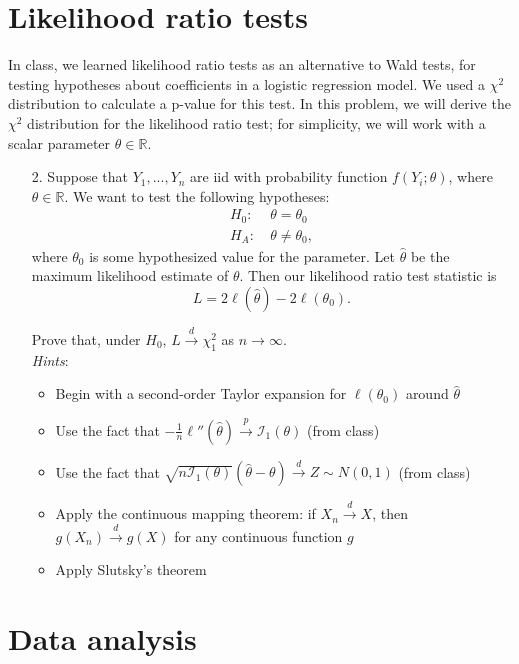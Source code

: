 \documentclass[11pt]{article}
\begin{document}
\section*{Likelihood ratio tests}

In class, we learned likelihood ratio tests as an alternative to Wald tests, for testing hypotheses about coefficients in a logistic regression model. We used a $\chi^2$ distribution to calculate a p-value for this test. In this problem, we will derive the $\chi^2$ distribution for the likelihood ratio test; for simplicity, we will work with a scalar parameter $\theta \in \mathbb{R}$.

\begin{enumerate}
\item[2.] Suppose that $Y_1,...,Y_n$ are iid with probability function $f(Y_i; \theta)$, where $\theta \in \mathbb{R}$. We want to test the following hypotheses:
\begin{align*}
H_0: \ &\theta = \theta_0 \\
H_A: \ &\theta \neq \theta_0,
\end{align*}
where $\theta_0$ is some hypothesized value for the parameter. Let $\widehat{\theta}$ be the maximum likelihood estimate of $\theta$. Then our likelihood ratio test statistic is
$$L = 2 \ell(\widehat{\theta}) - 2 \ell(\theta_0).$$

Prove that, under $H_0$, $L \overset{d}{\to} \chi^2_1$ as $n \to \infty$.\\

\textit{Hints}:
\begin{itemize}
\item Begin with a second-order Taylor expansion for $\ell(\theta_0)$ around $\widehat{\theta}$
\item Use the fact that $-\frac{1}{n} \ell''(\widehat{\theta}) \overset{p}{\to} \mathcal{I}_1(\theta)$ (from class)
\item Use the fact that $\sqrt{n \mathcal{I}_1(\theta)}(\widehat{\theta} - \theta) \overset{d}{\to} Z \sim N(0, 1)$ (from class)
\item Apply the continuous mapping theorem: if $X_n \overset{d}{\to} X$, then $g(X_n) \overset{d}{\to} g(X)$ for any continuous function $g$
\item Apply Slutsky's theorem
\end{itemize}
\end{enumerate}


\section*{Data analysis}
\end{document}
